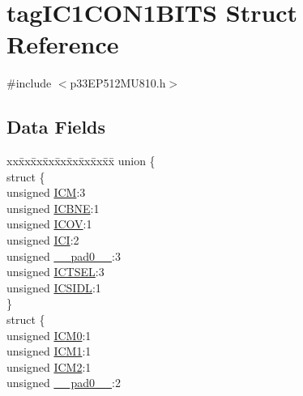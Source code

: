 \hypertarget{structtag_i_c1_c_o_n1_b_i_t_s}{}\section{tag\+I\+C1\+C\+O\+N1\+B\+I\+TS Struct Reference}
\label{structtag_i_c1_c_o_n1_b_i_t_s}


{\ttfamily \#include $<$p33\+E\+P512\+M\+U810.\+h$>$}

\subsection*{Data Fields}
\begin{DoxyCompactItemize}
\item 
\begin{tabbing}
xx\=xx\=xx\=xx\=xx\=xx\=xx\=xx\=xx\=\kill
union \{\\
\>struct \{\\
\>\>unsigned \hyperlink{structtag_i_c1_c_o_n1_b_i_t_s_ad3edde44ecb2d349ffa2decd0a251c20}{ICM}:3\\
\>\>unsigned \hyperlink{structtag_i_c1_c_o_n1_b_i_t_s_a824e7dcca83939e1b049d63ffcee33e9}{ICBNE}:1\\
\>\>unsigned \hyperlink{structtag_i_c1_c_o_n1_b_i_t_s_a49392949376ba0bf58cf8db889e86c94}{ICOV}:1\\
\>\>unsigned \hyperlink{structtag_i_c1_c_o_n1_b_i_t_s_a72486dcb868aad2d5c978494691356cc}{ICI}:2\\
\>\>unsigned \hyperlink{structtag_i_c1_c_o_n1_b_i_t_s_adf71f3d8410c1f1dbbc96680a92c49af}{\_\_pad0\_\_}:3\\
\>\>unsigned \hyperlink{structtag_i_c1_c_o_n1_b_i_t_s_a7a9dd41b5f93eb620df7fa336e452677}{ICTSEL}:3\\
\>\>unsigned \hyperlink{structtag_i_c1_c_o_n1_b_i_t_s_af441b36127c0bb7a35162dfc9a64103c}{ICSIDL}:1\\
\>\} \\
\>struct \{\\
\>\>unsigned \hyperlink{structtag_i_c1_c_o_n1_b_i_t_s_a649b1dd9bca75e558f37a9f52a829bd4}{ICM0}:1\\
\>\>unsigned \hyperlink{structtag_i_c1_c_o_n1_b_i_t_s_af3fe77ef9f8ca41ff11519f445e7bc77}{ICM1}:1\\
\>\>unsigned \hyperlink{structtag_i_c1_c_o_n1_b_i_t_s_a3c62c9cbbc3a406402126c932b709db8}{ICM2}:1\\
\>\>unsigned \hyperlink{structtag_i_c1_c_o_n1_b_i_t_s_adf71f3d8410c1f1dbbc96680a92c49af}{\_\_pad0\_\_}:2\\

\end{tabbing}
\end{DoxyCompactItemize}
